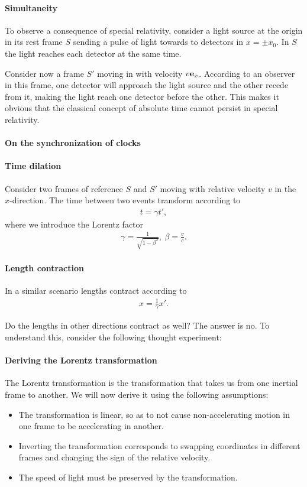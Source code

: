 \paragraph{Simultaneity}
To observe a consequence of special relativity, consider a light source at the origin in its rest frame $S$ sending a pulse of light towards to detectors in $x = \pm x_{0}$. In $S$ the light reaches each detector at the same time.

Consider now a frame $S'$ moving in with velocity $v\vb{e}_{x}$. According to an observer in this frame, one detector will approach the light source and the other recede from it, making the light reach one detector before the other. This makes it obvious that the classical concept of absolute time cannot persist in special relativity.

\paragraph{On the synchronization of clocks}

\paragraph{Time dilation}
Consider two frames of reference $S$ and $S'$ moving with relative velocity $v$ in the $x$-direction. The time between two events transform according to
\begin{align*}
	t = \gamma t',
\end{align*}
where we introduce the Lorentz factor
\begin{align*}
	\gamma = \frac{1}{\sqrt{1 - \beta^{2}}},\ \beta = \frac{v}{c}.
\end{align*}

\paragraph{Length contraction}
In a similar scenario lengths contract according to
\begin{align*}
	x = \frac{1}{\gamma}x'.
\end{align*}

Do the lengths in other directions contract as well? The answer is no. To understand this, consider the following thought experiment:

\paragraph{Deriving the Lorentz transformation}
The Lorentz transformation is the transformation that takes us from one inertial frame to another. We will now derive it using the following assumptions:
\begin{itemize}
	\item The transformation is linear, so as to not cause non-accelerating motion in one frame to be accelerating in another.
	\item Inverting the transformation corresponds to swapping coordinates in different frames and changing the sign of the relative velocity.
	\item The speed of light must be preserved by the transformation.
\end{itemize}

